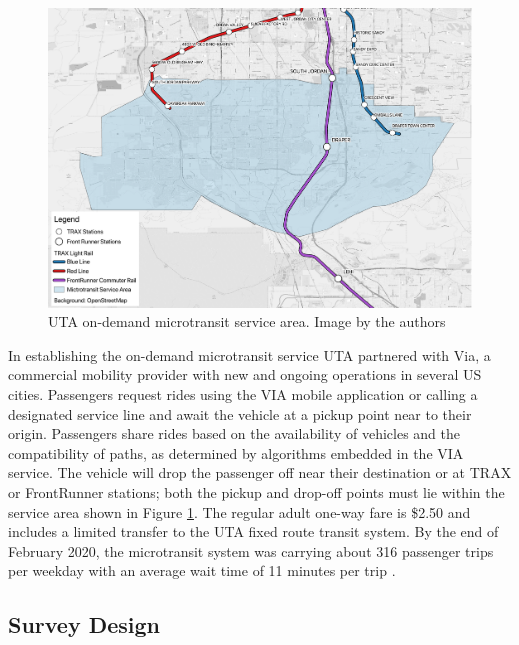 \documentclass[smartcities,article,submit,moreauthors,pdftex]{mdpi}
\begin{document}
\begin{figure}
\includegraphics[width=1\linewidth]{images/service_area} \caption{UTA on-demand microtransit service area. Image by the authors}\label{fig:via-map}
\end{figure}

In establishing the on-demand microtransit service UTA partnered with Via, a
commercial mobility provider with new and ongoing operations in several US
cities. Passengers request rides using the VIA mobile application or calling a
designated service line and await the vehicle at a pickup point near to their
origin. Passengers share rides based on the availability of vehicles and the
compatibility of paths, as determined by algorithms embedded in the VIA service.
The vehicle will drop the passenger off near their destination or at TRAX or
FrontRunner stations; both the pickup and drop-off points must lie within the
service area shown in Figure \ref{fig:via-map}. The regular adult one-way fare
is \$2.50 and includes a limited transfer to the UTA fixed route transit system.
By the end of February 2020, the microtransit system was carrying about 316
passenger trips per weekday with an average wait time of 11 minutes per trip
\citet{uta2020}.

\hypertarget{survey-design}{%
\subsection{Survey Design}\label{survey-design}}
\end{document}
